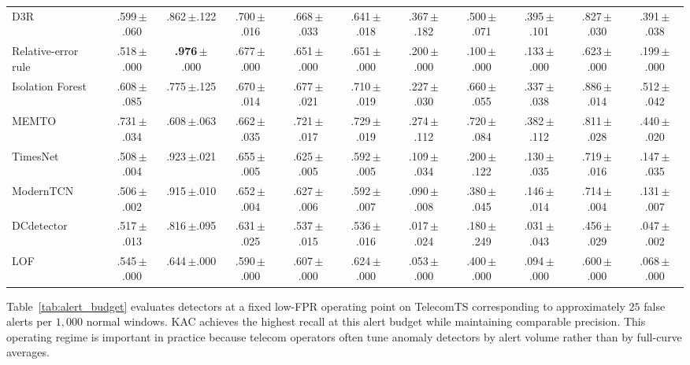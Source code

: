 \documentclass[conference]{IEEEtran}
\newcommand{\sd}[1]{\,{\fontsize{6pt}{7pt}\selectfont $\pm$#1}}
\begin{document}
\begin{table}[t]
\begin{tabular*}{\textwidth}{@{\extracolsep{\fill}}lcccccccccc@{}}
    D3R                       & .599\sd{.060} & .862\sd{.122} & .700\sd{.016} & .668\sd{.033} & .641\sd{.018}
                                                 & .367\sd{.182} & .500\sd{.071} & .395\sd{.101} & .827\sd{.030} & .391\sd{.038} \\
    Relative-error rule                          & .518\sd{.000} & \textbf{.976}\sd{.000} & .677\sd{.000} & .651\sd{.000} & .651\sd{.000}
                                                 & .200\sd{.000} & .100\sd{.000} & .133\sd{.000} & .623\sd{.000} & .199\sd{.000} \\
    Isolation Forest                             & .608\sd{.085} & .775\sd{.125} & .670\sd{.014} & .677\sd{.021} & .710\sd{.019}
                                                 & .227\sd{.030} & .660\sd{.055} & .337\sd{.038} & .886\sd{.014} & .512\sd{.042} \\
    MEMTO                   & .731\sd{.034} & .608\sd{.063} & .662\sd{.035} & .721\sd{.017} & .729\sd{.019}
                                                 & .274\sd{.112} & .720\sd{.084} & .382\sd{.112} & .811\sd{.028} & .440\sd{.020} \\
    TimesNet               & .508\sd{.004} & .923\sd{.021} & .655\sd{.005} & .625\sd{.005} & .592\sd{.005}
                                                 & .109\sd{.034} & .200\sd{.122} & .130\sd{.035} & .719\sd{.016} & .147\sd{.035} \\
    ModernTCN            & .506\sd{.002} & .915\sd{.010} & .652\sd{.004} & .627\sd{.006} & .592\sd{.007}
                                                 & .090\sd{.008} & .380\sd{.045} & .146\sd{.014} & .714\sd{.004} & .131\sd{.007} \\
    DCdetector         & .517\sd{.013} & .816\sd{.095} & .631\sd{.025} & .537\sd{.015} & .536\sd{.016}
                                                 & .017\sd{.024} & .180\sd{.249} & .031\sd{.043} & .456\sd{.029} & .047\sd{.002} \\
    LOF                                          & .545\sd{.000} & .644\sd{.000} & .590\sd{.000} & .607\sd{.000} & .624\sd{.000}
                                                 & .053\sd{.000} & .400\sd{.000} & .094\sd{.000} & .600\sd{.000} & .068\sd{.000} \\
    \bottomrule
  \end{tabular*}
\end{table}

Table~\ref{tab:alert_budget} evaluates detectors at a fixed low-FPR operating point on TelecomTS corresponding to approximately $25$ false alerts per $1{,}000$ normal windows. KAC achieves the highest recall at this alert budget while maintaining comparable precision. This operating regime is important in practice because telecom operators often tune anomaly detectors by alert volume rather than by full-curve averages.
\end{document}
